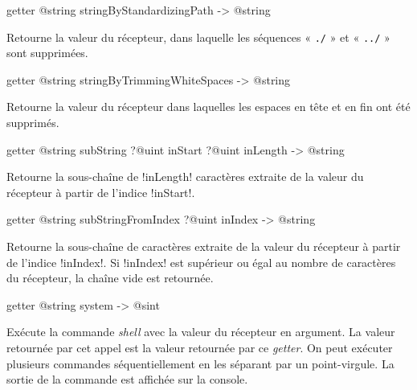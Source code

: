 
\begin{galgas3box}
getter @string stringByStandardizingPath -> @string
\end{galgas3box}

Retourne la valeur du récepteur, dans laquelle les séquences « \texttt{./} » et « \texttt{../} » sont supprimées.








\begin{galgas3box}
getter @string stringByTrimmingWhiteSpaces -> @string
\end{galgas3box}

Retourne la valeur du récepteur dans laquelles les espaces en tête et en fin ont été supprimés.





\begin{galgas3box}
getter @string subString ?@uint inStart ?@uint inLength -> @string
\end{galgas3box}

Retourne la sous-chaîne de \ggst!inLength! caractères extraite de la valeur du récepteur à partir de l'indice \ggst!inStart!.







\begin{galgas3box}
getter @string subStringFromIndex ?@uint inIndex -> @string
\end{galgas3box}

Retourne la sous-chaîne de caractères extraite de la valeur du récepteur à partir de l'indice \ggst!inIndex!. Si \ggst!inIndex! est supérieur ou égal au nombre de caractères du récepteur, la chaîne vide est retournée.







\begin{galgas3box}
getter @string system -> @sint
\end{galgas3box}


Exécute la commande \emph{shell} avec la valeur du récepteur en argument. La valeur retournée par cet appel est la valeur retournée par ce \emph{getter}. On peut exécuter plusieurs commandes séquentiellement en les séparant par un point-virgule. La sortie de la commande est affichée sur la console.

